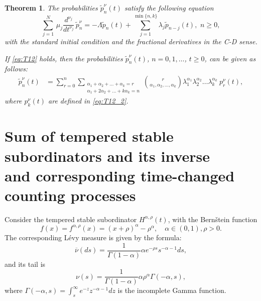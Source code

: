 \documentclass[12pt]{article}
\theoremstyle{definition}
\theoremstyle{plain}
\newtheorem{theorem}{Theorem}
\begin{document}
\begin{theorem}\label{genfM2}
The probabilities ${\tilde p}_n^\nu(t)$
satisfy the following  equation
\begin{equation}\label{genfM2eq}
	\sum_{j=1}^N \,\mu_j \frac{d^{\nu_j} }{dt^{\nu_j}}\, \tilde p_n^\nu = - \Lambda \tilde p_n(t) + \sum_{j=1}^{\min\{n,k\}}\lambda_j \tilde p_{n-j}(t), \,\, n\geq0,
\end{equation}
with the standard initial condition and the  fractional derivatives in the C-D sense.

If  \eqref{eq:T12} holds, then 
	the probabilities ${\tilde p}_n^\nu(t)$,  $n = 0, 1, \dots$, $t \ge 0$, can be given as follows:
		\begin{align*}\label{pGFCP}
		\tilde p_n^\nu(t) &= \sum_{r=0}^n \sum_{\substack{\alpha_1+\alpha_2+\dots+\alpha_k=r \\ \alpha_1+2\alpha_2+\dots+k\alpha_k=n}} \binom{r}{\alpha_1, \alpha_2, \dots, \alpha_k} \lambda_1^{\alpha_1} \lambda_2^{\alpha_2} \dots \lambda_k^{\alpha_k} \ p_r^\nu(t),
	\end{align*}
	where $p_k^\nu(t)$ are defined in \eqref{eq:T12_2}.
\end{theorem}	
	
	

\section{Sum of tempered stable subordinators and its inverse \\and corresponding time-changed counting processes}

Consider the tempered stable subordinator $H^{\alpha,\rho}(t)$, with the  Bern\v{s}tein function
    \begin{equation}\label{exf}
    f(x)=f^{\alpha,\rho}(x)=\left(x+\rho\right)^{\alpha}-\rho^{\alpha}, \quad \alpha\in (0,1), \rho>0.
    \end{equation}
    The corresponding L\'evy measure is given by the formula:
    \begin{equation*}
    \overline{\nu}(ds)=\frac{1}{\Gamma(1-\alpha)}\alpha e^{-\rho s}s^{-\alpha-1}ds,
    \end{equation*}
    and its tail is
    \begin{equation*}
    \nu(s)=\frac{1}{\Gamma(1-\alpha)}\alpha \rho^{\alpha}\Gamma(-\alpha,s),
    \end{equation*}
    where $\Gamma(-\alpha,s)=\int_{s}^{\infty}e^{-z}z^{-\alpha-1}dz$ is the incomplete Gamma function.
\end{document}
